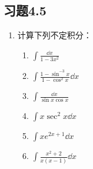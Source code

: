 \subsection*{习题4.5}
\begin{enumerate}
    \item 计算下列不定积分：
\begin{multicols}{2}
\begin{enumerate}
    \item $\displaystyle\int \frac{\dd x}{1-3x^2}$
    \item $\displaystyle\int \frac{1-\sin^{-3}x}{1-\cos^2 x}\dd x$
    \item $\displaystyle\int \frac{\dd x}{\sin x\cos x}$
    \item $\displaystyle\int x\sec^2 x\dd x$
    \item $\displaystyle\int xe^{2x+1}\dd x$
    \item $\displaystyle\int \frac{x^2+2}{x(x-1)}\dd x$
\end{enumerate}
\end{multicols}


\end{enumerate}
